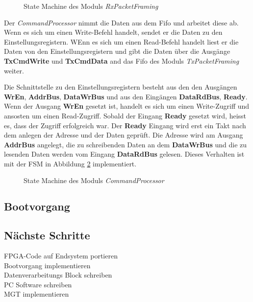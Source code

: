 \documentclass{article}
\begin{document}
\begin{figure}[tb]
    \caption{State Machine des Moduls \textit{RxPacketFraming}}
    \label{fig:fsm_rx_packet_framing}
\end{figure}

Der \textit{CommandProcessor} nimmt die Daten aus dem Fifo und arbeitet diese ab. Wenn es sich um einen Write-Befehl handelt, sendet er die Daten zu den Einstellungsregistern. WEnn es sich um einen Read-Befehl handelt liest er die Daten von den Einstellungsregistern und gibt die Daten über die Ausgänge \textbf{TxCmdWrite} und \textbf{TxCmdData} and das Fifo des Moduls \textit{TxPacketFraming} weiter.

Die Schnittstelle zu den Einstellungsregistern besteht aus den den Ausgängen \textbf{WrEn}, \textbf{AddrBus}, \textbf{DataWrBus} und aus den Eingängen \textbf{DataRdBus}, \textbf{Ready}.
Wenn der Ausgang \textbf{WrEn} gesetzt ist, handelt es sich um einen Write-Zugriff und ansosten um einen Read-Zugriff. Sobald der Eingang \textbf{Ready} gesetzt wird, heisst es, dass der Zugriff erfolgreich war. Der \textbf{Ready} Eingang wird erst ein Takt nach dem anlegen der Adresse und der Daten geprüft. Die Adresse wird am Ausgang \textbf{AddrBus} angelegt, die zu schreibenden Daten an dem \textbf{DataWrBus} und die zu lesenden Daten werden vom Eingang \textbf{DataRdBus} gelesen. Dieses Verhalten ist mit der FSM in Abbildung \ref{fig:fsm_command_processor} implementiert.

\begin{figure}[tb]
    \caption{State Machine des Moduls \textit{CommandProcessor}}
    \label{fig:fsm_command_processor}
\end{figure}

\subsection{Bootvorgang}

\subsection{Nächste Schritte}
FPGA-Code auf Endsystem portieren\\
Bootvorgang implementieren\\
Datenverarbeitungs Block schreiben\\
PC Software schreiben\\
MGT implementieren
\end{document}
